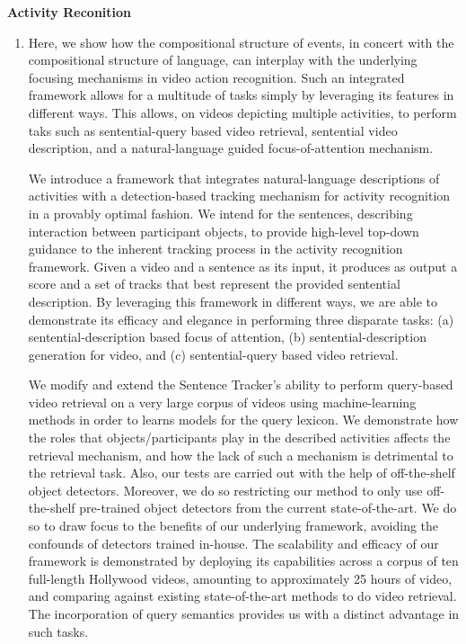 \documentclass[10pt]{article}
\newenvironment{researchBlock}[1]{%
  \vspace*{0.5ex}
  {\large \textbf{#1}}
  \begin{enumerate}\item[]}
  {\end{enumerate}}
\begin{document}
\begin{researchBlock} {Activity Reconition}

  Here, we show how the compositional structure of events, in concert with the
  compositional structure of language, can interplay with the underlying
  focusing mechanisms in video action recognition. Such an integrated framework
  allows for a multitude of tasks simply by leveraging its features in
  different ways. This allows, on videos depicting multiple activities, to
  perform taks such as sentential-query based video retrieval, sentential video
  description, and a natural-language guided focus-of-attention mechanism.

  We introduce a framework that integrates natural-language descriptions of
  activities with a detection-based tracking mechanism for activity recognition
  in a provably optimal fashion.
  We intend for the sentences, describing interaction between participant
  objects, to provide high-level top-down guidance to the inherent tracking
  process in the activity recognition framework.
  Given a video and a sentence as its input, it produces as output a score and a
  set of tracks that best represent the provided sentential description.
  By leveraging this framework in different ways, we are able to demonstrate its
  efficacy and elegance in performing three disparate tasks: (a)
  sentential-description based focus of attention, (b) sentential-description
  generation for video, and (c) sentential-query based video retrieval.


  We modify and extend the Sentence Tracker’s ability to perform query-based
  video retrieval on a very large corpus of videos using machine-learning
  methods in order to learns models for the query lexicon.
  We demonstrate how the roles that objects/participants play in the described
  activities affects the retrieval mechanism, and how the lack of such a
  mechanism is detrimental to the retrieval task.
  Also, our tests are carried out with the help of off-the-shelf object
  detectors.
  Moreover, we do so restricting our method to only use off-the-shelf pre-trained
  object detectors from the current state-of-the-art.
  We do so to draw focus to the benefits of our underlying framework, avoiding
  the confounds of detectors trained in-house.
  The scalability and efficacy of our framework is demonstrated by deploying its
  capabilities across a corpus of ten full-length Hollywood videos, amounting to
  approximately 25 hours of video, and comparing against existing
  state-of-the-art methods to do video retrieval.
  The incorporation of query semantics provides us with a distinct advantage in
  such tasks.



\end{researchBlock}
\end{document}
